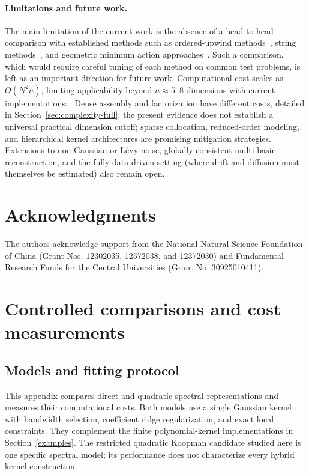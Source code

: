 \documentclass[11pt]{article}
\theoremstyle{plain}      %
\theoremstyle{definition} %
\providecommand{\DIFaddtex}[1]{{\protect\color{blue}#1}} %
\providecommand{\DIFdeltex}[1]{{\protect\color{red}#1}} %
\providecommand{\DIFaddbegin}{} %
\providecommand{\DIFaddend}{} %
\providecommand{\DIFdelbegin}{} %
\providecommand{\DIFdelend}{} %
\providecommand{\DIFadd}[1]{\texorpdfstring{\DIFaddtex{#1}}{#1}} %
\providecommand{\DIFdel}[1]{\texorpdfstring{\DIFdeltex{#1}}{}} %
\newcommand{\DIFscaledelfig}{1.0}
\newlength{\DIFdelgraphicswidth} %
\newlength{\DIFdelgraphicsheight} %
\newcommand{\DIFaddincludegraphics}[2][]{{\color{blue}\fbox{\DIFOincludegraphics[#1]{#2}}}} %
\newcommand{\DIFdelincludegraphics}[2][]{%
\sbox{\DIFdelgraphicsbox}{\DIFOincludegraphics[#1]{#2}}%
\settoboxwidth{\DIFdelgraphicswidth}{\DIFdelgraphicsbox} %
\settoboxtotalheight{\DIFdelgraphicsheight}{\DIFdelgraphicsbox} %
\scalebox{\DIFscaledelfig}{%
\parbox[b]{\DIFdelgraphicswidth}{\usebox{\DIFdelgraphicsbox}\\[-\baselineskip] \rule{\DIFdelgraphicswidth}{0em}}\llap{\resizebox{\DIFdelgraphicswidth}{\DIFdelgraphicsheight}{%
\setlength{\unitlength}{\DIFdelgraphicswidth}%
\begin{picture}(1,1)%
\thicklines\linethickness{2pt} %
{\color[rgb]{1,0,0}\put(0,0){\framebox(1,1){}}}%
{\color[rgb]{1,0,0}\put(0,0){\line( 1,1){1}}}%
{\color[rgb]{1,0,0}\put(0,1){\line(1,-1){1}}}%
\end{picture}%
}\hspace*{3pt}}} %
} %
\DeclareRobustCommand{\DIFaddbegin}{\DIFOaddbegin \let\includegraphics\DIFaddincludegraphics} %
\DeclareRobustCommand{\DIFaddend}{\DIFOaddend \let\includegraphics\DIFOincludegraphics} %
\DeclareRobustCommand{\DIFdelbegin}{\DIFOdelbegin \let\includegraphics\DIFdelincludegraphics} %
\DeclareRobustCommand{\DIFdelend}{\DIFOaddend \let\includegraphics\DIFOincludegraphics} %
\begin{document}
\paragraph{Limitations and future work.}
The main limitation of the current work is the absence of a head-to-head comparison with established methods such as ordered-upwind methods~\cite{cameron2012finding, dahiya2018ordered}, string methods~\cite{heymann2008geometric, grafke2019numerical}, and geometric minimum action approaches~\cite{zhou2008adaptive}. Such a comparison, which would require careful tuning of each method on common test problems, is left as an important direction for future work.
\DIFdelbegin \DIFdel{Computational cost scales as $O(N^2 n)$, limiting applicability beyond $n\approx 5$--8 dimensions with current implementations; }\DIFdelend\ \DIFaddbegin \DIFadd{Dense assembly and factorization have different costs, detailed in Section~\ref{sec:complexity-full}; the present evidence does not establish a universal practical dimension cutoff; }\DIFaddend sparse collocation, reduced-order modeling, and hierarchical kernel architectures are promising mitigation strategies. Extensions to non-Gaussian or Lévy noise, globally consistent multi-basin reconstruction, and the fully data-driven setting (where drift and diffusion must themselves be estimated) also remain open.

\section*{Acknowledgments}	
The authors acknowledge support from the National Natural Science Foundation of China (Grant Nos. 12302035, 12572038, and 12372030) and Fundamental Research Funds for the Central Universities (Grant No. 30925010411).

\DIFaddbegin \clearpage
\appendix
\section{\DIFadd{Controlled comparisons and cost measurements}}\label{app:additional}
\subsection{\DIFadd{Models and fitting protocol}}\label{app:protocol}
\DIFadd{This appendix compares direct and quadratic spectral representations and measures their computational costs. Both models use a single Gaussian kernel with bandwidth selection, coefficient ridge regularization, and exact local constraints. They complement the finite polynomial-kernel implementations in Section~\ref{examples}. The restricted quadratic Koopman candidate studied here is one specific spectral model; its performance does not characterize every hybrid kernel construction.
}
\end{document}
